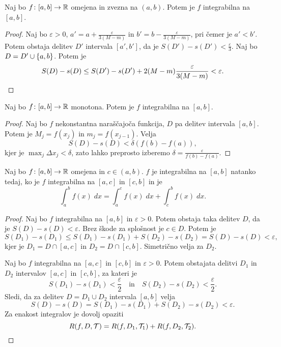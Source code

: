 \documentclass[12pt, a4paper]{article}
\begin{document}
\begin{trditev}
Naj bo $f\colon[a,b]\to\mathbb{R}$ omejena in zvezna na $(a,b)$. Potem je $f$ integrabilna na $[a,b]$.
\end{trditev}

\begin{proof}
Naj bo $\varepsilon>0$, $a'=a+\frac{\varepsilon}{3(M-m)}$ in $b'=b-\frac{\varepsilon}{3(M-m)}$, pri čemer je $a'<b'$. Potem obstaja delitev $D'$ intervala $[a',b']$, da je $S(D')-s(D')<\frac{\varepsilon}{3}$. Naj bo $D=D'\cup\left\{a,b\right\}$. Potem je
\[
S(D)-s(D)\leq S(D')-s(D')+2(M-m)\frac{\varepsilon}{3(M-m)}<\varepsilon.\qedhere
\]
\end{proof}

\begin{izrek}
Naj bo $f\colon[a,b]\to\mathbb{R}$ monotona. Potem je $f$ integrabilna na $[a,b]$.
\end{izrek}

\begin{proof}
Naj bo $f$ nekonstantna naraščajoča funkcija, $D$ pa delitev intervala $[a,b]$. Potem je $M_j=f(x_j)$ in $m_j=f(x_{j-1})$. Velja
\[
S(D)-s(D)<\delta(f(b)-f(a)),
\]
kjer je $\displaystyle\max_j\Delta x_j<\delta$, zato lahko preprosto izberemo $\delta=\frac{\varepsilon}{f(b)-f(a)}$.
\end{proof}

\begin{trditev}
Naj bo $f\colon[a,b]\to\mathbb{R}$ omejena in $c\in(a,b)$. $f$ je integrabilna na $[a,b]$ natanko tedaj, ko je $f$ integrabilna na $[a,c]$ in $[c,b]$ in je
\[
\int_a^b f(x)\;dx=\int_a^c f(x)\;dx+\int_c^b f(x)\;dx.
\]
\end{trditev}

\begin{proof}
Naj bo $f$ integrabilna na $[a,b]$ in $\varepsilon>0$. Potem obstaja taka delitev $D$, da je $S(D)-s(D)<\varepsilon$. Brez škode za splošnost je $c\in D$. Potem je
\[
S(D_1)-s(D_1)\leq S(D_1)-s(D_1)+S(D_2)-s(D_2)=S(D)-s(D)<\varepsilon,
\]
kjer je $D_1=D\cap[a,c]$ in $D_2=D\cap[c,b]$. Simetrično velja za $D_2$.

Naj bo $f$ integrabilna na $[a,c]$ in $[c,b]$ in $\varepsilon>0$. Potem obstajata delitvi $D_1$ in $D_2$ intervalov $[a,c]$ in $[c,b]$, za kateri je
\[
S(D_1)-s(D_1)<\frac{\varepsilon}{2}\quad\text{in}\quad S(D_2)-s(D_2)<\frac{\varepsilon}{2}.
\]
Sledi, da za delitev $D=D_1\cup D_2$ intervala $[a,b]$ velja
\[
S(D)-s(D)=S(D_1)-s(D_1)+S(D_2)-s(D_2)<\varepsilon.
\]
Za enakost integralov je dovolj opaziti
\[
R(f,D,\mathcal{T})=R(f,D_1,\mathcal{T}_1)+R(f,D_2,\mathcal{T}_2).\qedhere
\]
\end{proof}
\end{document}
